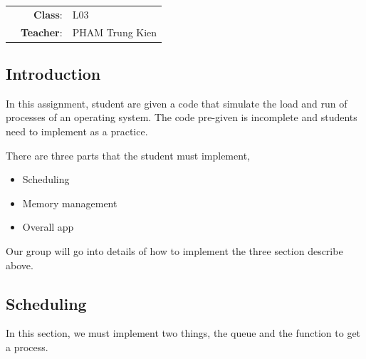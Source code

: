 \documentclass[]{article}
\providecommand{\tightlist}{%
  \setlength{\itemsep}{0pt}\setlength{\parskip}{0pt}}
\begin{document}
\begin{titlepage}
\begin{table}[h]
\begin{tabular}{rrl}
\end{tabular}
\end{table}
\vspace{-0.2cm}

\begin{table}[h]
\begin{tabular}{rrl}
\hspace{5cm} & \textbf{Class}: & L03 \\
\hspace{5cm} & \textbf{Teacher}: & PHAM Trung Kien \\

\end{tabular}
\end{table}
\vspace{1cm}

\begin{center}
\end{center}
\end{titlepage}

\newpage
\thispagestyle{empty}
\tableofcontents
\newpage

\subsection{Introduction}\label{introduction}

In this assignment, student are given a code that simulate the load and
run of processes of an operating system. The code pre-given is
incomplete and students need to implement as a practice.

There are three parts that the student must implement,

\begin{itemize}
\tightlist
\item
  Scheduling
\item
  Memory management
\item
  Overall app
\end{itemize}

Our group will go into details of how to implement the three section
describe above.

\subsection{Scheduling}\label{scheduling}

In this section, we must implement two things, the queue and the
function to get a process.
\end{document}
